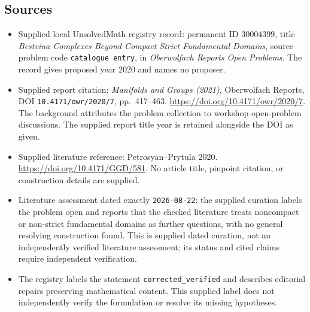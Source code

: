 \documentclass[11pt]{article}
\begin{document}
\subsection{Sources}
\begin{itemize}
\item Supplied local UnsolvedMath registry record: permanent ID \(30004399\), title \emph{Bestvina Complexes Beyond Compact Strict Fundamental Domains}, source problem code \texttt{catalogue entry}, in \emph{Oberwolfach Reports Open Problems}. The record gives proposed year 2020 and names no proposer.
\item Supplied report citation: \emph{Manifolds and Groups (2021)}, Oberwolfach Reports, DOI \texttt{10.4171/owr/2020/7}, pp.~417--463. \url{https://doi.org/10.4171/owr/2020/7}. The background attributes the problem collection to workshop open-problem discussions. The supplied report title year is retained alongside the DOI as given.
\item Supplied literature reference: Petrosyan--Prytula 2020. \url{https://doi.org/10.4171/GGD/581}. No article title, pinpoint citation, or construction details are supplied.
\item Literature assessment dated exactly \texttt{2026-08-22}: the supplied curation labels the problem open and reports that the checked literature treats noncompact or non-strict fundamental domains as further questions, with no general resolving construction found. This is supplied dated curation, not an independently verified literature assessment; its status and cited claims require independent verification.
\item The registry labels the statement \texttt{corrected\_verified} and describes editorial repairs preserving mathematical content. This supplied label does not independently verify the formulation or resolve its missing hypotheses.
\end{itemize}
\end{document}
